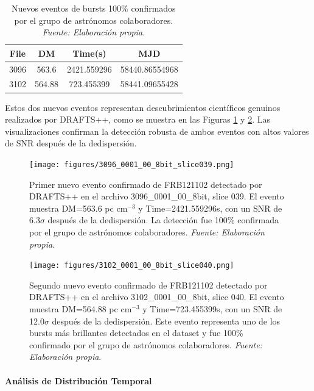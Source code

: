 \begin{table}[H]
    \centering
    \caption{Nuevos eventos de bursts 100\% confirmados por el grupo de astrónomos colaboradores. \textit{Fuente: Elaboración propia}.}
    \label{tab:new_confirmed_bursts}
    \begin{tabular}{|c|c|c|c|}
        \hline
        \textbf{File} & \textbf{DM} & \textbf{Time(s)} & \textbf{MJD} \\
        \hline
        3096 & 563.6 & 2421.559296 & 58440.86554968 \\
        3102 & 564.88 & 723.455399 & 58441.09655428 \\
        \hline
    \end{tabular}
\end{table}

Estos dos nuevos eventos representan descubrimientos científicos genuinos realizados por DRAFTS++, como se muestra en las Figuras \ref{fig:new_event_3096} y \ref{fig:new_event_3102}. Las visualizaciones confirman la detección robusta de ambos eventos con altos valores de SNR después de la dedispersión.

\begin{figure}[H]
    \centering
    \texttt{[image: figures/3096\_0001\_00\_8bit\_slice039.png]}
    \caption{Primer nuevo evento confirmado de FRB121102 detectado por DRAFTS++ en el archivo 3096\_0001\_00\_8bit, slice 039. El evento muestra DM=563.6 pc cm$^{-3}$ y Time=2421.559296s, con un SNR de 6.3$\sigma$ después de la dedispersión. La detección fue 100\% confirmada por el grupo de astrónomos colaboradores. \textit{Fuente: Elaboración propia}.}
    \label{fig:new_event_3096}
\end{figure}

\begin{figure}[H]
    \centering
    \texttt{[image: figures/3102\_0001\_00\_8bit\_slice040.png]}
    \caption{Segundo nuevo evento confirmado de FRB121102 detectado por DRAFTS++ en el archivo 3102\_0001\_00\_8bit, slice 040. El evento muestra DM=564.88 pc cm$^{-3}$ y Time=723.455399s, con un SNR de 12.0$\sigma$ después de la dedispersión. Este evento representa uno de los bursts más brillantes detectados en el dataset y fue 100\% confirmado por el grupo de astrónomos colaboradores. \textit{Fuente: Elaboración propia}.}
    \label{fig:new_event_3102}
\end{figure}

\paragraph{Análisis de Distribución Temporal}

